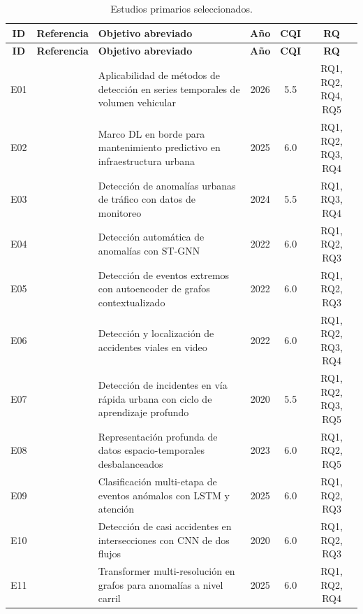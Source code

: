\documentclass[12pt, a4paper]{article}
\begin{document}
\begin{longtable}{clp{4.2cm}ccc}
\caption{Estudios primarios seleccionados.\label{tab:estudios}}\\
\toprule
\textbf{ID} & \textbf{Referencia} & \textbf{Objetivo abreviado} & \textbf{A\~{n}o} & \textbf{CQI} & \textbf{RQ} \\
\midrule\endfirsthead
\midrule\textbf{ID}&\textbf{Referencia}&\textbf{Objetivo abreviado}&\textbf{A\~{n}o}&\textbf{CQI}&\textbf{RQ}\\
\midrule\endhead\endfoot\bottomrule\endlastfoot
E01 & \cite{taheri2026applicability} & Aplicabilidad de m\'{e}todos de detecci\'{o}n en series temporales de volumen vehicular & 2026 & 5.5 & RQ1, RQ2, RQ4, RQ5 \\
E02 & \cite{abdallah2025aipurban}   & Marco DL en borde para mantenimiento predictivo en infraestructura urbana & 2025 & 6.0 & RQ1, RQ2, RQ3, RQ4 \\
E03 & \cite{mao2024detecting}       & Detecci\'{o}n de anomal\'{i}as urbanas de tr\'{a}fico con datos de monitoreo & 2024 & 5.5 & RQ1, RQ3, RQ4 \\
E04 & \cite{zhang2022automatic}     & Detecci\'{o}n autom\'{a}tica de anomal\'{i}as con ST-GNN & 2022 & 6.0 & RQ1, RQ2, RQ3 \\
E05 & \cite{hu2022detecting}        & Detecci\'{o}n de eventos extremos con autoencoder de grafos contextualizado & 2022 & 6.0 & RQ1, RQ2, RQ3 \\
E06 & \cite{pawar2022deep}          & Detecci\'{o}n y localizaci\'{o}n de accidentes viales en video & 2022 & 6.0 & RQ1, RQ2, RQ3, RQ4 \\
E07 & \cite{fang2020deep}           & Detecci\'{o}n de incidentes en v\'{i}a r\'{a}pida urbana con ciclo de aprendizaje profundo & 2020 & 5.5 & RQ1, RQ2, RQ3, RQ5 \\
E08 & \cite{mehrannia2023deep}      & Representaci\'{o}n profunda de datos espacio-temporales desbalanceados & 2023 & 6.0 & RQ1, RQ2, RQ5 \\
E09 & \cite{jadhav2025multistage}   & Clasificaci\'{o}n multi-etapa de eventos an\'{o}malos con LSTM y atenci\'{o}n & 2025 & 6.0 & RQ1, RQ2, RQ3 \\
E10 & \cite{huang2020intelligent}   & Detecci\'{o}n de casi accidentes en intersecciones con CNN de dos flujos & 2020 & 6.0 & RQ1, RQ2, RQ3 \\
E11 & \cite{park2025graph}          & Transformer multi-resoluci\'{o}n en grafos para anomal\'{i}as a nivel carril & 2025 & 6.0 & RQ1, RQ2, RQ4 \\

\end{longtable}
\end{document}
